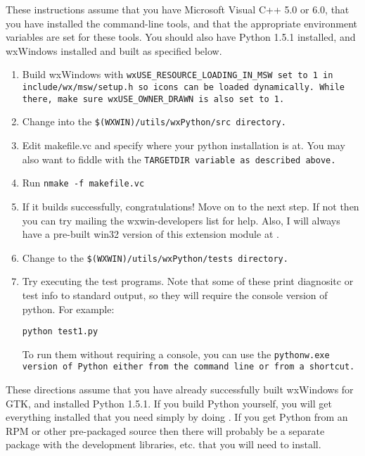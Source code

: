
These instructions assume that you have Microsoft Visual C++ 5.0 or
6.0, that you have installed the command-line tools, and that the
appropriate environment variables are set for these tools.  You should
also have Python 1.5.1 installed, and wxWindows installed and built as
specified below.

\begin{enumerate}\itemsep=0pt
\item Build wxWindows with \tt{wxUSE_RESOURCE_LOADING_IN_MSW} set to 1 in
\tt{include/wx/msw/setup.h} so icons can be loaded dynamically.  While
there, make sure \tt{wxUSE_OWNER_DRAWN} is also set to 1.

\item Change into the \tt{\$(WXWIN)/utils/wxPython/src} directory.

\item Edit makefile.vc and specify where your python installation is at.
You may also want to fiddle with the \tt{TARGETDIR} variable as described
above.

\item Run \tt{nmake -f makefile.vc}

\item If it builds successfully, congratulations!  Move on to the next
step.  If not then you can try mailing the wxwin-developers list for
help.  Also, I will always have a pre-built win32 version of this extension module at
.

\item Change to the \tt{\$(WXWIN)/utils/wxPython/tests} directory.

\item Try executing the test programs.  Note that some of these print
diagnositc or test info to standard output, so they will require the
console version of python.  For example:

    \tt{python test1.py}

To run them without requiring a console, you can use the \tt{pythonw.exe}
version of Python either from the command line or from a shortcut.

\end{enumerate}



These directions assume that you have already successfully built
wxWindows for GTK, and installed Python 1.5.1.  If you build Python
yourself, you will get everything installed that you need simply by
doing .  If you get Python from an RPM or other
pre-packaged source then there will probably be a separate package
with the development libraries, etc. that you will need to install.



